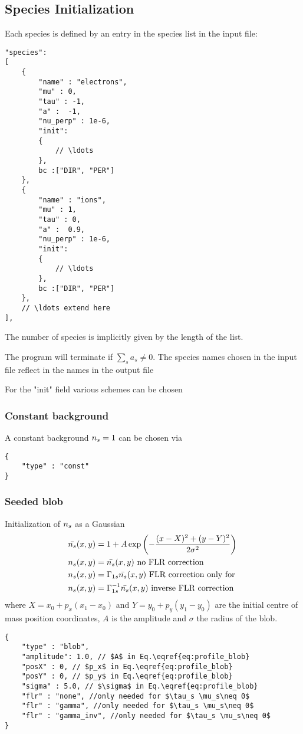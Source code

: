\subsection{Species Initialization}
Each species is defined by an entry in the species list in the input file:
\begin{verbatim}
"species":
[
    {
        "name" : "electrons",
        "mu" : 0,
        "tau" : -1,
        "a" :  -1,
        "nu_perp" : 1e-6,
        "init":
        {
            // \ldots
        },
        bc :["DIR", "PER"]
    },
    {
        "name" : "ions",
        "mu" : 1,
        "tau" : 0,
        "a" :  0.9,
        "nu_perp" : 1e-6,
        "init":
        {
            // \ldots
        },
        bc :["DIR", "PER"]
    },
    // \ldots extend here
],
\end{verbatim}
The number of species is implicitly given by the length of the list.
\begin{tcolorbox}[title=Note]
    The program will terminate if $\sum_s a_s \neq 0$. The species names chosen in the input file reflect in the names in the output file
\end{tcolorbox}

For the "init" field various schemes can be chosen
\subsubsection{Constant background}
A constant background ${n_s}  = 1$ can be chosen via
\begin{verbatim}
{
    "type" : "const"
}
\end{verbatim}
\subsubsection{Seeded blob}
Initialization of ${n_s} $ as a Gaussian
\begin{align} \label{eq:profile_blob}
    \bar {{n_s} }(x,y) &= 1 + A\exp\left( -\frac{(x-X)^2 + (y-Y)^2}{2\sigma^2}\right) \\
    {n_s} (x,y) &= \bar {{n_s} }(x,y) \text{ no FLR correction} \\
    {n_s} (x,y) &= \Gamma_{1s}\bar {{n_s} }(x,y) \text{ FLR correction only for } \\
    {n_s} (x,y) &= \Gamma_{1s}^{-1}\bar {{n_s} }(x,y) \text{ inverse FLR correction} \\
\end{align}
where $X = x_0 + p_x (x_1 - x_0)$ and $Y= y_0 + p_y( y_1 - y_0)$ are the initial centre of mass position coordinates, $A$ is the amplitude and $\sigma$ the
radius of the blob.
\begin{verbatim}
{
    "type" : "blob",
    "amplitude": 1.0, // $A$ in Eq.\eqref{eq:profile_blob}
    "posX" : 0, // $p_x$ in Eq.\eqref{eq:profile_blob}
    "posY" : 0, // $p_y$ in Eq.\eqref{eq:profile_blob}
    "sigma" : 5.0, // $\sigma$ in Eq.\eqref{eq:profile_blob}
    "flr" : "none", //only needed for $\tau_s \mu_s\neq 0$
    "flr" : "gamma", //only needed for $\tau_s \mu_s\neq 0$
    "flr" : "gamma_inv", //only needed for $\tau_s \mu_s\neq 0$
}
\end{verbatim}
